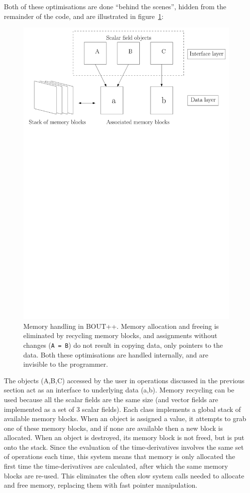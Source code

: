 \documentclass[12pt]{article}
\newcommand{\code}[1]{\texttt{#1}}
\begin{document}
Both of these optimisations are done ``behind the scenes'', hidden from the remainder
of the code, and are illustrated in figure~\ref{fig:memory}:
\begin{figure}[htb!]
\centering
\includegraphics[scale=0.75]{figs/memory.pdf}
\caption{Memory handling in BOUT++. Memory allocation and freeing is eliminated by recycling memory blocks, and assignments without changes (\code{A = B}) do not result in copying data, only pointers to the data. Both these optimisations are handled internally, and are invisible to the programmer.}
\label{fig:memory}
\end{figure}
The objects (A,B,C) accessed by the user in operations
discussed in the previous section act as an interface to underlying data (a,b). 
Memory recycling can be used because all the scalar fields are the same size (and vector fields are
implemented as a set of 3 scalar fields). Each class implements a global stack of available
memory blocks. When an object is assigned a value, it attempts to grab one of these memory blocks,
and if none are available then a new block is allocated. 
When an object is destroyed, its memory block is not freed, but is put onto the
stack. Since the evaluation of the time-derivatives involves the same set of operations each time, this system
means that memory is only allocated the first time the time-derivatives are calculated, after which the same 
memory blocks are re-used. This eliminates the often slow system calls needed to allocate and free memory,
replacing them with fast pointer manipulation. 
\end{document}
